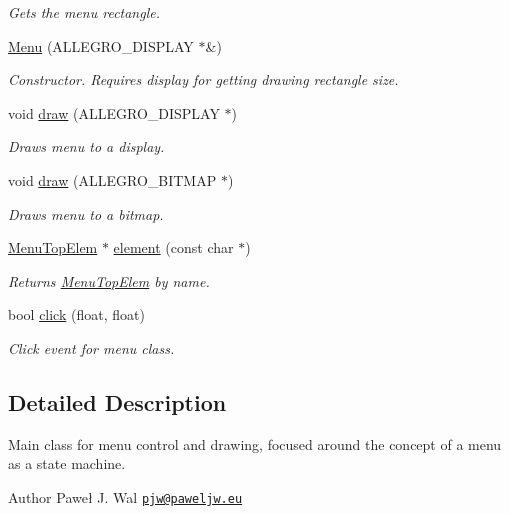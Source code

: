 \begin{DoxyCompactItemize}
\begin{DoxyCompactList}\small\item\em Gets the menu rectangle. \end{DoxyCompactList}\item 
\hyperlink{classMenu_a874c7ad27dc60ee1c7a1dba967eb862a}{Menu} (A\-L\-L\-E\-G\-R\-O\-\_\-\-D\-I\-S\-P\-L\-A\-Y $\ast$\&)
\begin{DoxyCompactList}\small\item\em Constructor. Requires display for getting drawing rectangle size. \end{DoxyCompactList}\item 
void \hyperlink{classMenu_a31cf335228dde31efa66fe0fce72b480}{draw} (A\-L\-L\-E\-G\-R\-O\-\_\-\-D\-I\-S\-P\-L\-A\-Y $\ast$)
\begin{DoxyCompactList}\small\item\em Draws menu to a display. \end{DoxyCompactList}\item 
void \hyperlink{classMenu_a936d3fc2cb379a20a783ace3a003630f}{draw} (A\-L\-L\-E\-G\-R\-O\-\_\-\-B\-I\-T\-M\-A\-P $\ast$)
\begin{DoxyCompactList}\small\item\em Draws menu to a bitmap. \end{DoxyCompactList}\item 
\hyperlink{classMenuTopElem}{Menu\-Top\-Elem} $\ast$ \hyperlink{classMenu_a1f10ff99ab0704c947518aa4495a8f46}{element} (const char $\ast$)
\begin{DoxyCompactList}\small\item\em Returns \hyperlink{classMenuTopElem}{Menu\-Top\-Elem} by name. \end{DoxyCompactList}\item 
bool \hyperlink{classMenu_acfbe6e873089c2c464dda4afb5bc4352}{click} (float, float)
\begin{DoxyCompactList}\small\item\em Click event for menu class. \end{DoxyCompactList}\end{DoxyCompactItemize}


\subsection{Detailed Description}
Main class for menu control and drawing, focused around the concept of a menu as a state machine. 

\begin{DoxyAuthor}{Author}
Paweł J. Wal \href{mailto:pjw@paweljw.eu}{\tt pjw@paweljw.\-eu} 
\end{DoxyAuthor}


